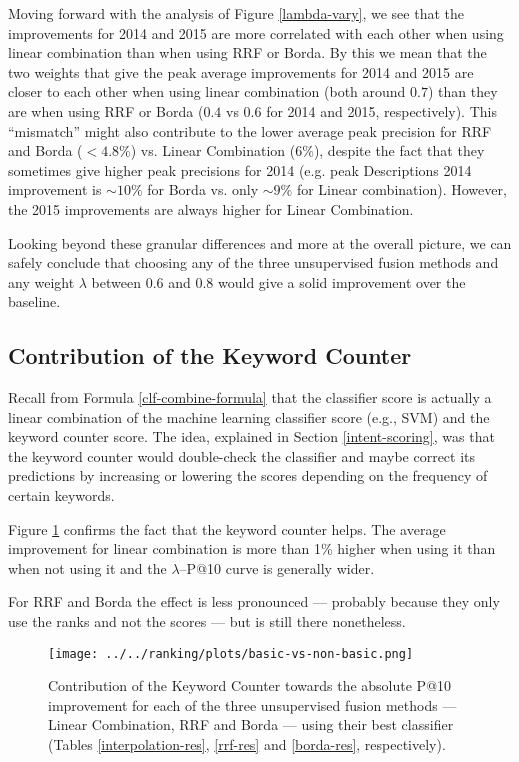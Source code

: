 Moving forward with the analysis of Figure \ref{lambda-vary}, we see that
the improvements for 2014 and 2015 are more correlated with each other when using linear combination than when using
RRF or Borda. By this we mean that the two weights that give the peak average improvements for 2014 and 2015 are closer to each other
when using linear combination (both around $0.7$) than they are when using RRF or Borda ($0.4$ vs $0.6$ for 2014 and 2015, respectively).
This ``mismatch'' might also contribute to the lower average peak precision for RRF and Borda ($<4.8\%$)
vs. Linear Combination ($6\%$), despite the fact that they sometimes
give higher peak precisions for 2014 (e.g. peak Descriptions 2014 improvement
is $\sim10\%$ for Borda vs. only $\sim9\%$ for Linear combination). However, the 2015 improvements are always higher for
Linear Combination.

Looking beyond these granular differences and more at the overall picture, we can safely conclude
that choosing any of the three unsupervised fusion methods and any weight $\lambda$ between 0.6 and 0.8 would give
a solid improvement over the baseline.

\subsection{Contribution of the Keyword Counter}
Recall from Formula \ref{clf-combine-formula} that the classifier score is actually
a linear combination of the machine learning classifier score (e.g., SVM) and the keyword counter score. The idea,
explained in Section \ref{intent-scoring},
was that the keyword counter would double-check the classifier and maybe correct its predictions by
increasing or lowering the scores depending on the frequency of certain keywords.

Figure \ref{basic-effect-plot}
confirms the fact that the keyword counter helps. The average improvement for linear combination is more than 1\% higher
when using it than when not using it and the $\lambda$--P@10 curve is generally wider.

For RRF and Borda the effect is less pronounced --- probably because they only use the ranks and not the scores ---
but is still there nonetheless.

\begin{figure}[h!]
\centerline{
  \texttt{[image: ../../ranking/plots/basic-vs-non-basic.png]}
  }
  \caption{Contribution of the Keyword Counter towards the absolute P@10 improvement for each of the three unsupervised
  fusion methods --- Linear Combination, RRF and Borda --- using their best classifier (Tables \ref{interpolation-res}, \ref{rrf-res}
and \ref{borda-res}, respectively).}
  \label{basic-effect-plot}
\end{figure}

